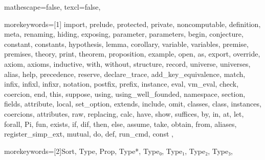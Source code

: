 
 {

mathescape=false,
texcl=false,

morekeywords=[1]{
import, prelude, protected, private, noncomputable, definition, meta, renaming,
hiding, exposing, parameter, parameters, begin, conjecture, constant, constants,
hypothesis, lemma, corollary, variable, variables, premise, premises, theory,
print, theorem, proposition, example,
open, as, export, override, axiom, axioms, inductive, with, without,
structure, record, universe, universes,
alias, help, precedence, reserve, declare_trace, add_key_equivalence,
match, infix, infixl, infixr, notation, postfix, prefix, instance,
eval, vm_eval, check, coercion, end, this, suppose,
using, using_well_founded, namespace, section, fields,
attribute, local, set_option, extends, include, omit, classes, class,
instances, coercions, attributes, raw, replacing,
calc, have, show, suffices, by, in, at, let, forall, Pi, fun,
exists, if, dif, then, else, assume, take, obtain, from, aliases, register_simp_ext,
mutual, do, def, run_cmd, const
},

morekeywords=[2]{Sort, Type, Prop, Type*, Type₀, Type₁, Type₂, Type₃},



}
